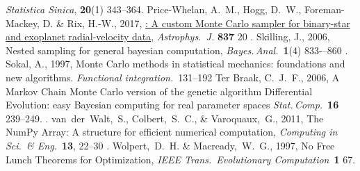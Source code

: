 \documentclass[modern]{aastex61}
\begin{document}
\begin{thebibliography}{}
  \textit{Statistica Sinica}, \textbf{20}(1) 343--364.
  Price-Whelan, A.~M., Hogg, D.~W., Foreman-Mackey, D. \& Rix, H.-W., 2017,
  \href{http://adsabs.harvard.edu/abs/2017ApJ...837...20P}{: A custom Monte Carlo sampler for binary-star and
  exoplanet radial-velocity data},
  \textit{Astrophys.\ J.} \textbf{837} 20
  .
  Skilling, J., 2006,
  Nested sampling for general bayesian computation,
  \textit{Bayes.\,Anal.}\ \textbf{1}(4) 833-–860
  .
    Sokal, A., 1997,
    Monte Carlo methods in statistical mechanics: foundations and new algorithms.
    \textit{Functional integration.}\ 131--192
  Ter Braak, C.~J.~F., 2006,
  A Markov Chain Monte Carlo version of the genetic algorithm
  Differential Evolution: easy Bayesian computing for real
  parameter spaces
  \textit{Stat.\,Comp.}\ \textbf{16} 239--249.
  .
  van~der~Walt,~S., Colbert,~S.~C., \& Varoquaux,~G., 2011,
  The NumPy Array: A structure for efficient numerical computation,
  \textit{Computing in Sci.\ \& Eng.}\ \textbf{13}, 22--30
  .
  Wolpert,~D.~H. \& Macready,~W.~G., 1997,
  No Free Lunch Theorems for Optimization,
  \textit{IEEE Trans.\ Evolutionary Computation}\ \textbf{1} 67.
\end{thebibliography}
\end{document}
